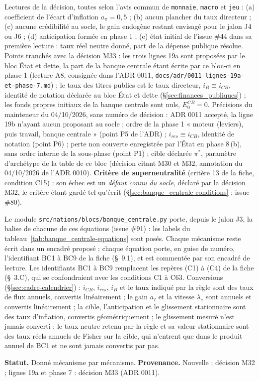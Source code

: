 \documentclass[11pt,a4paper]{article}
\begin{document}
\begin{proposee}
Lectures de la décision, toutes selon l'avis commun de \texttt{monnaie}, \texttt{macro} et \texttt{jeu} : (a) coefficient de l'écart d'inflation $a_\pi = 0{,}5$ ; (b) aucun plancher du taux directeur ; (c) aucune crédibilité au socle, le gain endogène restant envisagé pour le jalon J4 ou J6 ; (d) anticipation formée en phase 1 ; (e) état initial de l'issue \#44 dans sa première lecture : taux réel neutre donné, part de la dépense publique résolue. Points tranchés avec la décision M33 : les trois lignes 19a sont proposées par le bloc État et dette, la part de la banque centrale étant écrite par ce bloc-ci en phase 1 (lecture A8, consignée dans l'ADR 0011, \nolinkurl{docs/adr/0011-lignes-19a-et-phase-7.md}) ; le taux des titres publics est le taux directeur, $i_B \equiv i_{\mathit{CB}}$, identité de notation déclarée au bloc État et dette (\S\ref{sec:finances_publiques}) ; les fonds propres initiaux de la banque centrale sont nuls, $E^{\mathit{CB}}_0 = 0$. Précisions du mainteneur du 04/10/2026, sans numéro de décision : ADR 0011 accepté, la ligne 19b n'ayant aucun proposant au socle ; ordre de la phase 1 « moteur (leviers), puis travail, banque centrale » (point P5 de l'ADR) ; $i_{\mathit{res}} \equiv i_{\mathit{CB}}$, identité de notation (point P6) ; perte non couverte enregistrée par l'État en phase 8\,(b), sans ordre interne de la sous-phase (point P1) ; cible déclarée $\pi^\ast$, paramètre d'archétype de la table de ce bloc (décision citant M30 et M32, annotation du 04/10/2026 de l'ADR 0010). \textbf{Critère de superneutralité} (critère 13 de la fiche, condition C15) : son échec est un \emph{défaut connu du socle}, déclaré par la décision M32, le critère étant gardé tel qu'écrit (\S\ref{sec:banque_centrale-conditions} ; issue \#80).

Le module \nolinkurl{src/nations/blocs/banque_centrale.py} porte, depuis le jalon J3, la balise de chacune de ces équations (issue \#91) : les labels du tableau~\ref{tab:banque_centrale-equations} sont posés. Chaque mécanisme reste écrit dans un encadré proposé ; chaque équation porte, en guise de numéro, l'identifiant BC1 à BC9 de la fiche (\S~9.1), et est commentée par son encadré de lecture. Les identifiants BC1 à BC9 remplacent les repères (C1) à (C4) de la fiche (\S~3.C), qui se confondraient avec les conditions C1 à C63. Conversions (\S\ref{sec:cadre-calendrier}) : $i_{\mathit{CB}}$, $i_{\mathit{res}}$, $i_B$ et le taux indiqué par la règle sont des taux de flux annuels, convertis linéairement ; le gain $a_I$ et la vitesse $\lambda_e$ sont annuels et convertis linéairement ; la cible, l'anticipation et le glissement stationnaire sont des taux d'inflation, convertis géométriquement ; le glissement mesuré n'est jamais converti ; le taux neutre retenu par la règle et sa valeur stationnaire sont des taux réels annuels de Fisher sur la cible, qui n'entrent que dans le produit annuel de BC1 et ne sont jamais convertis par pas.

\textbf{Statut.} Donné mécanisme par mécanisme. \textbf{Provenance.} Nouvelle ; décision M32 ; lignes 19a et phase 7 : décision M33 (ADR 0011).
\end{proposee}
\end{document}
